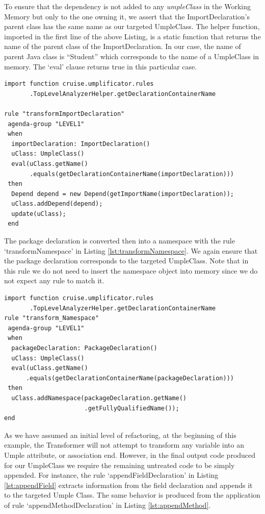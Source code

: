 To ensure that the dependency is not added to any \textit{umpleClass} in the Working Memory but only to the one owning it, we assert that the ImportDeclaration's parent class has the same name as our targeted UmpleClass. The helper function, imported in the first line of the above Listing, is a static function that returns the name of the parent class of the ImportDeclaration. In our case, the name of parent Java class is ``Student'' which corresponds to the name of a UmpleClass in memory. The `eval' clause returns true in this particular case.

\begin{lstlisting}[language={drools},label={lst:ruleImport}, caption=Rule transformImportDeclaration]
import function cruise.umplificator.rules
       .TopLevelAnalyzerHelper.getDeclarationContainerName
      
rule "transformImportDeclaration"
 agenda-group "LEVEL1" 
 when
  importDeclaration: ImportDeclaration()
  uClass: UmpleClass()
  eval(uClass.getName()
       .equals(getDeclarationContainerName(importDeclaration)))		
 then
  Depend depend = new Depend(getImportName(importDeclaration));
  uClass.addDepend(depend);
  update(uClass);
 end
\end{lstlisting}

The package declaration is converted then into a namespace with the rule `transformNamespace' in Listing \ref{lst:transformNamespace}. We again ensure that the package declaration corresponds to the targeted UmpleClass. Note that in this rule we do not need to insert the namespace object into memory since we do not expect any rule to match it.

\begin{lstlisting}[language={drools},label={lst:transformNamespace}, caption=Rule transformNamespace]
import function cruise.umplificator.rules
       .TopLevelAnalyzerHelper.getDeclarationContainerName
rule "transform_Namespace"
 agenda-group "LEVEL1" 
 when
  packageDeclaration: PackageDeclaration()
  uClass: UmpleClass()
  eval(uClass.getName()
      .equals(getDeclarationContainerName(packageDeclaration)))	
 then
  uClass.addNamespace(packageDeclaration.getName()
                      .getFullyQualifiedName());
end
\end{lstlisting}

As we have assumed an initial level of refactoring, at the beginning of this example, the Transformer will not attempt to transform any variable into an Umple attribute, or association end. However, in the final output code produced for our UmpleClass we require the remaining untreated code to be simply appended. For instance, the rule `appendFieldDeclaration' in Listing \ref{lst:appendField} extracts information from the field declaration and appends it to the targeted Umple Class. The same behavior is produced from the application of rule `appendMethodDeclaration' in Listing \ref{lst:appendMethod}.

